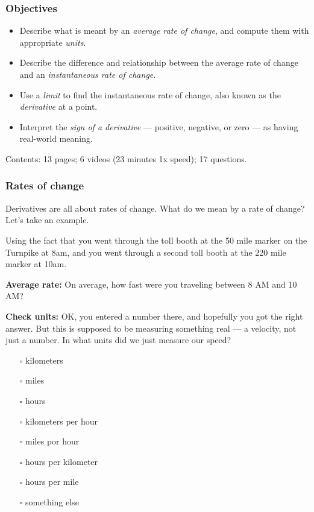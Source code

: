 \documentclass[pdftex, brazil, 12pt, twoside]{article}
\begin{document}
\subsubsection{Objectives}
\label{u1-what-obj}

\begin{itemize}[noitemsep]
\item Describe what is meant by an \emph{average rate of change}, and compute
  them with appropriate \emph{units}.
\item Describe the difference and relationship between the average rate of change
  and an \emph{instantaneous rate of change}.
\item Use a \emph{limit} to find the instantaneous rate of change, also known
  as the \emph{derivative} at a point.
\item Interpret the \emph{sign of a derivative} --- positive, negative, or zero
  --- as having real-world meaning.
\end{itemize}

Contents: 13 pages; 6 videos (23 minutes 1x speed); 17 questions.

\subsubsection{Rates of change}
\label{u1-what-rates-of-change}

Derivatives are all about rates of change. What do we mean by a rate of change?
Let's take an example.

Using the fact that you went through the toll booth at the 50 mile marker on the
Turnpike at 8am, and you went through a second toll booth at the 220 mile marker
at 10am.

\begin{exercise}
  \textbf{Average rate:} On average, how fast were you traveling between 8 AM and 10 AM?
\end{exercise}

\begin{exercise}
  \textbf{Check units:} OK, you entered a number there, and hopefully you got
  the right answer. But this is supposed to be measuring something real --- a velocity,
  not just a number. In what units did we just measure our speed?
\begin{itemize}[noitemsep]
\item[$\square$] kilometers
\item[$\square$] miles
\item[$\square$] hours
\item[$\square$] kilometers per hour
\item[$\square$] miles por hour
\item[$\square$] hours per kilometer
\item[$\square$] hours per mile
\item[$\square$] something else
\end{itemize}
\end{exercise}
\end{document}
